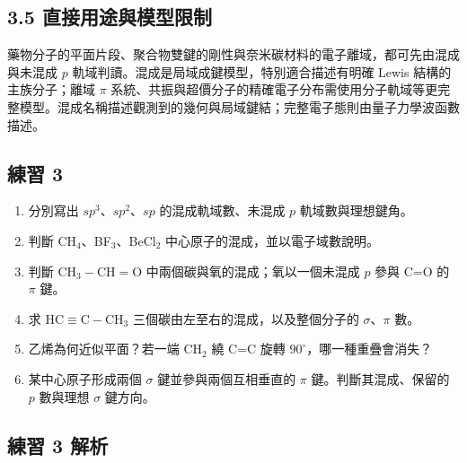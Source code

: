 \documentclass[11pt,a4paper]{article}
\providecommand{\tightlist}{%
  \setlength{\itemsep}{0pt}\setlength{\parskip}{0pt}}
\begin{document}
\subsection{3.5 直接用途與模型限制}\label{ux76f4ux63a5ux7528ux9014ux8207ux6a21ux578bux9650ux5236}

藥物分子的平面片段、聚合物雙鍵的剛性與奈米碳材料的電子離域，都可先由混成與未混成 \(p\) 軌域判讀。混成是局域成鍵模型，特別適合描述有明確 Lewis 結構的主族分子；離域 \(\pi\) 系統、共振與超價分子的精確電子分布需使用分子軌域等更完整模型。混成名稱描述觀測到的幾何與局域鍵結；完整電子態則由量子力學波函數描述。

\subsection{練習 3}\label{ux7df4ux7fd2-3}

\begin{enumerate}
\def\labelenumi{\arabic{enumi}.}
\tightlist
\item
  分別寫出 \(sp^3\)、\(sp^2\)、\(sp\) 的混成軌域數、未混成 \(p\) 軌域數與理想鍵角。
\item
  判斷 CH\(_4\)、BF\(_3\)、BeCl\(_2\) 中心原子的混成，並以電子域數說明。
\item
  判斷 \(\mathrm{CH_3-CH=O}\) 中兩個碳與氧的混成；氧以一個未混成 \(p\) 參與 C=O 的 \(\pi\) 鍵。
\item
  求 \(\mathrm{HC\equiv C-CH_3}\) 三個碳由左至右的混成，以及整個分子的 \(\sigma\)、\(\pi\) 數。
\item
  乙烯為何近似平面？若一端 CH\(_2\) 繞 C=C 旋轉 \(90^\circ\)，哪一種重疊會消失？
\item
  某中心原子形成兩個 \(\sigma\) 鍵並參與兩個互相垂直的 \(\pi\) 鍵。判斷其混成、保留的 \(p\) 數與理想 \(\sigma\) 鍵方向。
\end{enumerate}

\subsection{練習 3 解析}\label{ux7df4ux7fd2-3-ux89e3ux6790}
\end{document}
